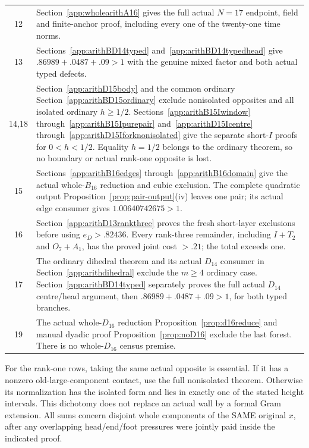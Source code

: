 \documentclass[11pt]{article}
\begin{document}
\begin{longtable}{cp{10.3cm}}
12&Section~\ref{app:wholearithA16}
gives the full actual \(N=17\)
endpoint, field and finite-anchor
proof, including every one of
the twenty-one time norms.\\
13&Sections~\ref{app:arithBD14typed}
and~\ref{app:arithBD14typedhead}
give \(.86989+.0487+.09>1\)
with the genuine mixed factor
and both actual typed defects.\\
14,18&Section~\ref{app:arithD15body}
and the common ordinary
Section~\ref{app:arithBD15ordinary}
exclude nonisolated opposites and
all isolated ordinary \(h\ge1/2\).
Sections~\ref{app:arithB15Iwindow}
through~\ref{app:arithB15Ipurepair}
and~\ref{app:arithD15Icentre}
through~\ref{app:arithD15Iforknonisolated}
give the separate short-\(I\)
proofs for \(0<h<1/2\).
Equality \(h=1/2\) belongs to the
ordinary theorem, so no boundary
or actual rank-one opposite is lost.\\
15&Sections~\ref{app:arithB16edges}
through~\ref{app:arithB16domain}
give the actual whole-\(B_{16}\)
reduction and cubic exclusion.
The complete quadratic output
Proposition~\ref{prop:pair-output}(iv)
leaves one pair; its actual edge
consumer gives \(1.00640742675>1\).\\
16&Section~\ref{app:arithD13rankthree}
proves the fresh short-layer
exclusions before using
\(e_D>.82436\).
Every rank-three remainder,
including \(I+T_2\) and
\(O_7+A_1\), has the proved
joint cost \(>.21\);
the total exceeds one.\\
17&The ordinary dihedral theorem
and its actual \(D_{14}\) consumer
in Section~\ref{app:arithdihedral}
exclude the \(m\ge4\) ordinary case.
Section~\ref{app:arithBD14typed}
separately proves the full actual
\(D_{14}\) centre/head argument,
then \(.86989+.0487+.09>1\),
for both typed branches.\\
19&The actual whole-\(D_{16}\)
reduction
Proposition~\ref{prop:d16reduce}
and manual dyadic proof
Proposition~\ref{prop:noD16}
exclude the last forest.
There is no whole-\(D_{16}\) census
premise.\\
\bottomrule
\end{longtable}

For the rank-one rows, taking the
same actual opposite is essential.
If it has a nonzero old-large-component
contact, use the full nonisolated
theorem. Otherwise its normalization
has the isolated form and lies in
exactly one of the stated height
intervals. This dichotomy does not
replace an actual wall by a formal
Gram extension.
All sums concern disjoint whole
components of the SAME original
\(x\), after any overlapping
head/end/foot pressures were jointly
paid inside the indicated proof.
\end{document}
